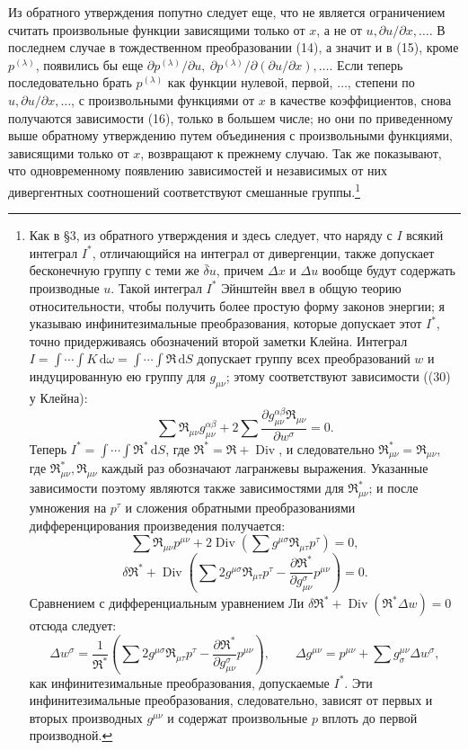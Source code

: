 \documentclass[11pt]{article}
\providecommand{\D}{\Delta}
\providecommand{\p}{\partial}
\providecommand{\dd}{\mathrm d}
\DeclareMathOperator{\Div}{Div}
\providecommand{\bd}{\bar{\delta}}
\begin{document}
Из обратного утверждения попутно следует еще, что не является ограничением считать произвольные функции зависящими только от \(x\), а не от \(u,\p u/\p x,\ldots\). В последнем случае в тождественном преобразовании (14), а значит и в (15), кроме \(p^{(\lambda)}\), появились бы еще \(\p p^{(\lambda)}/\p u,\ \p p^{(\lambda)}/\p(\p u/\p x),\ldots\). Если теперь последовательно брать \(p^{(\lambda)}\) как функции нулевой, первой, \(\ldots\), степени по \(u,\p u/\p x,\ldots\), с произвольными функциями от \(x\) в качестве коэффициентов, снова получаются зависимости (16), только в большем числе; но они по приведенному выше обратному утверждению путем объединения с произвольными функциями, зависящими только от \(x\), возвращают к прежнему случаю. Так же показывают, что одновременному появлению зависимостей и независимых от них дивергентных соотношений соответствуют смешанные группы.\footnote{Как в \S{}3, из обратного утверждения и здесь следует, что наряду с \(I\) всякий интеграл \(I^*\), отличающийся на интеграл от дивергенции, также допускает бесконечную группу с теми же \(\bd u\), причем \(\D x\) и \(\D u\) вообще будут содержать производные \(u\). Такой интеграл \(I^*\) Эйнштейн ввел в общую теорию относительности, чтобы получить более простую форму законов энергии; я указываю инфинитезимальные преобразования, которые допускает этот \(I^*\), точно придерживаясь обозначений второй заметки Клейна. Интеграл \(I=\int\!\cdots\!\int K\,\dd\omega=\int\!\cdots\!\int \mathfrak{R}\,\dd S\) допускает группу всех преобразований \(w\) и индуцированную ею группу для \(g_{\mu\nu}\); этому соответствуют зависимости ((30) у Клейна):
\[
\sum \mathfrak{R}_{\mu\nu}g_{\mu\nu}^{\alpha\beta}
+2\sum\frac{\p g_{\mu\nu}^{\alpha\beta}\mathfrak{R}_{\mu\nu}}{\p w^\sigma}=0.
\]
Теперь \(I^*=\int\!\cdots\!\int \mathfrak{R}^*\,\dd S\), где \(\mathfrak{R}^*=\mathfrak{R}+\Div\), и следовательно \(\mathfrak{R}_{\mu\nu}^*=\mathfrak{R}_{\mu\nu}\), где \(\mathfrak{R}_{\mu\nu}^*,\mathfrak{R}_{\mu\nu}\) каждый раз обозначают лагранжевы выражения. Указанные зависимости поэтому являются также зависимостями для \(\mathfrak{R}_{\mu\nu}^*\); и после умножения на \(p^\tau\) и сложения обратными преобразованиями дифференцирования произведения получается:
\[
\sum \mathfrak{R}_{\mu\nu}p^{\mu\nu}
+2\Div\!\left(\sum g^{\mu\sigma}\mathfrak{R}_{\mu\tau}p^\tau\right)=0,
\]
\[
\delta\mathfrak{R}^*+\Div\!\left(\sum 2g^{\mu\sigma}\mathfrak{R}_{\mu\tau}p^\tau
-\frac{\p\mathfrak{R}^*}{\p g_{\mu\nu}^{\sigma}}p^{\mu\nu}\right)=0.
\]
Сравнением с дифференциальным уравнением Ли \(\delta\mathfrak{R}^*+\Div(\mathfrak{R}^*\D w)=0\) отсюда следует:
\[
\D w^\sigma=\frac1{\mathfrak{R}^*}\left(\sum 2g^{\mu\sigma}\mathfrak{R}_{\mu\tau}p^\tau
-\frac{\p\mathfrak{R}^*}{\p g_{\mu\nu}^{\sigma}}p^{\mu\nu}\right),
\qquad
\D g^{\mu\nu}=p^{\mu\nu}+\sum g^{\mu\nu}_{\sigma}\D w^\sigma,
\]
как инфинитезимальные преобразования, допускаемые \(I^*\). Эти инфинитезимальные преобразования, следовательно, зависят от первых и вторых производных \(g^{\mu\nu}\) и содержат произвольные \(p\) вплоть до первой производной.}
\end{document}
